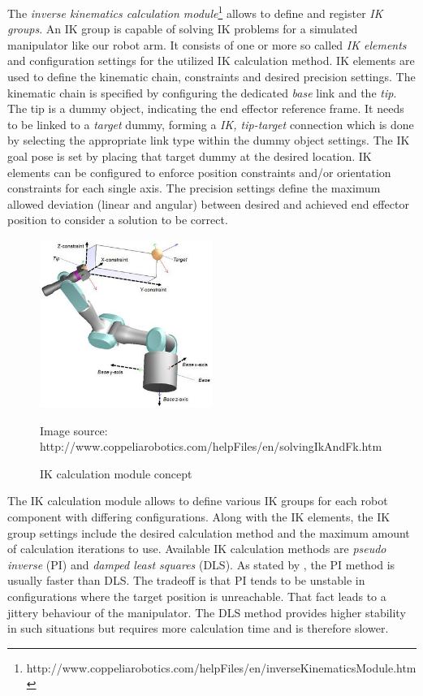 The \emph{inverse kinematics calculation module}\footnote{http://www.coppeliarobotics.com/helpFiles/en/inverseKinematicsModule.htm} allows to define and register \emph{IK groups}. An IK group is capable of solving IK problems for a simulated manipulator like our robot arm. It consists of one or more so called \emph{IK elements} and configuration settings for the utilized IK calculation method. IK elements are used to define the kinematic chain, constraints and desired precision settings. The kinematic chain is specified by configuring the dedicated \emph{base} link and the \emph{tip}. The tip is a dummy object, indicating the end effector reference frame. It needs to be linked to a \emph{target} dummy, forming a \emph{IK, tip-target} connection which is done by selecting the appropriate link type within the dummy object settings. The IK goal pose is set by placing that target dummy at the desired location. IK elements can be configured to enforce position constraints and/or orientation constraints for each single axis. The precision settings define the maximum allowed deviation (linear and angular) between desired and achieved end effector position to consider a solution to be correct. \\

\begin{figure}[htb]
	\centering
  	\includegraphics[width=0.5\textwidth]{images/ik_vrep.jpg}
	\caption{IK calculation module concept}
	{\scriptsize Image source: http://www.coppeliarobotics.com/helpFiles/en/solvingIkAndFk.htm}
	\label{fig:ik_vrep}
\end{figure}

The IK calculation module allows to define various IK groups for each robot component with differing configurations. Along with the IK elements, the IK group settings include the desired calculation method and the maximum amount of calculation iterations to use. Available IK calculation methods are \emph{pseudo inverse} (PI) and \emph{damped least squares} (DLS). As stated by \cite{buss2004}, the PI method is usually faster than DLS. The tradeoff is that PI tends to be unstable in configurations where the target position is unreachable. That fact leads to a jittery behaviour of the manipulator. The DLS method provides higher stability in such situations but requires more calculation time and is therefore slower. \\

